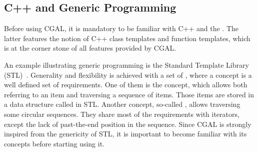 


\subsection{C++ and Generic Programming}

Before using CGAL, it is mandatory to be familiar with C++ and the
. The latter features the notion
of C++ class templates and function templates, which is at the corner
stone of all features provided by CGAL.

An example illustrating generic programming is the Standard Template
Library (STL)~\cite{ms-stl-96}. Generality and flexibility is achieved
with a set of , where a concept is a well defined set
of requirements. One of them is the  concept, which
allows both referring to an item and traversing a sequence of
items. Those items are stored in a data structure called
 in STL. Another concept, so-called
, allows traversing some circular sequences. They
share most of the requirements with iterators, except the lack of
past-the-end position in the sequence. Since CGAL is strongly inspired
from the genericity of STL, it is important to become familiar with
its concepts before starting using it.


